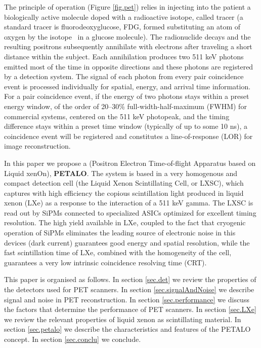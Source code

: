 \documentclass[review]{elsarticle}
\begin{document}
The principle of operation (Figure \ref{fig.pet}) relies in injecting into the patient a  
biologically active molecule doped with a radioactive isotope, called tracer (a standard tracer is fluorodeoxyglucose, FDG, formed substituting an atom of oxygen by the isotope \FDG\ in a glucose molecule). The radionuclide decays and the resulting positrons
subsequently annihilate with electrons after traveling a short distance within the subject.
Each annihilation produces two 511 keV photons emitted most of the time in opposite
directions and these photons are registered by a detection system. The signal of each photon
from every pair coincidence event is processed individually for spatial, energy, and arrival
time information. For a pair coincidence event, if the energy of two photons stays within a
preset energy window, of the order of 20--30\% full-width-half-maximum (FWHM) for commercial systems, centered on the 511 keV photopeak, and the timing difference stays within a preset time window (typically of up to some 10 ns), a
coincidence event will be registered and constitutes a line-of-response (LOR) for image
reconstruction.

In this paper we propose a (Positron Electron Time-of-flight Apparatus based on Liquid xenOn), {\bf PETALO}. The system is based in a very homogenous and compact detection cell (the Liquid Xenon Scintillating Cell, or LXSC), which captures with high efficiency the copious scintillation light produced in liquid xenon (LXe) as a response to the interaction of a 511 keV gamma.  The LXSC is read out by SiPMs connected to specialized ASICs optimized for excellent timing resolution. The high yield available in LXe, coupled to the fact that cryogenic operation of SiPMs eliminates the leading source of electronic noise in this devices (dark current) guarantees good energy and spatial resolution, while the fast scintillation time of LXe, combined with the homogeneity of the cell, guarantees a very low intrinsic coincidence resolving time (CRT).

This paper is organised as follows. In section \ref{sec.det} we review the properties of the detectors used for PET scanners. In section \ref{sec.signalAndNoise} we describe signal and noise in PET reconstruction. In section \ref{sec.performance} we discuss the factors that determine the performance of PET scanners. In section \ref{sec.LXe} we review the relevant properties of liquid xenon as scintillating material. In section \ref{sec.petalo} we describe the characteristics and features of the PETALO concept. In section \ref{sec.conclu} we conclude. 
\end{document}
